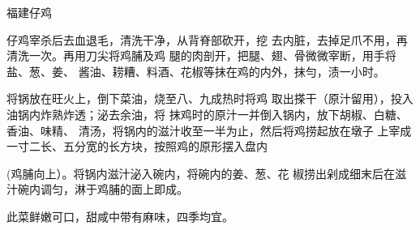 \begin{recipe}{福建仔鸡}

\ingredients


\cooking

\step 仔鸡宰杀后去血退毛，清洗干净，从背脊部砍开，挖 去内脏，去掉足爪不用，再清洗一次。再用刀尖将鸡脯及鸡 腿的肉剖开，把腿、翅、骨微微宰断，用手将盐、葱、姜、 酱油、耢糟、料酒、花椒等抹在鸡的内外，抹勻，渍一小时。

\step 将锅放在旺火上，倒下菜油，烧至八、九成热时将鸡 取出搽干（原汁留用），投入油锅内炸熟炸透；泌去余油，将 抹鸡时的原汁一并倒入锅内，放下胡椒、白糖、香油、味精、 清汤，将锅内的滋汁收至一半为止，然后将鸡捞起放在墩子 上宰成一寸二长、五分宽的长方块，按照鸡的原形摆入盘内

(鸡脯向上）。将锅内滋汁泌入碗内，将碗内的姜、葱、花 椒捞出剁成细末后在滋汁碗内调匀，淋于鸡脯的面上即成。

\notes

此菜鲜嫩可口，甜咸中带有麻味，四季均宜。

\end{recipe}

